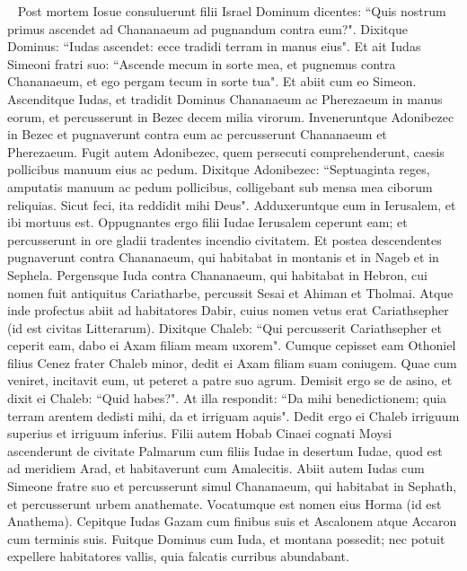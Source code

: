 
\begin{biblechapter}   
\verse Post mortem Iosue consuluerunt filii Israel Dominum dicentes: “Quis nostrum primus ascendet ad Chananaeum ad pugnandum contra eum?". 
\verse Dixitque Dominus: “Iudas ascendet: ecce tradidi terram in manus eius". 
\verse Et ait Iudas Simeoni fratri suo: “Ascende mecum in sorte mea, et pugnemus contra Chananaeum, et ego pergam tecum in sorte tua". Et abiit cum eo Simeon. 
\verse Ascenditque Iudas, et tradidit Dominus Chananaeum ac Pherezaeum in manus eorum, et percusserunt in Bezec decem milia virorum. 
\verse Inveneruntque Adonibezec in Bezec et pugnaverunt contra eum ac percusserunt Chananaeum et Pherezaeum. 
\verse Fugit autem Adonibezec, quem persecuti comprehenderunt, caesis pollicibus manuum eius ac pedum. 
\verse Dixitque Adonibezec: “Septuaginta reges, amputatis manuum ac pedum pollicibus, colligebant sub mensa mea ciborum reliquias. Sicut feci, ita reddidit mihi Deus". Adduxeruntque eum in Ierusalem, et ibi mortuus est. 
\verse Oppugnantes ergo filii Iudae Ierusalem ceperunt eam; et percusserunt in ore gladii tradentes incendio civitatem. 
\verse Et postea descendentes pugnaverunt contra Chananaeum, qui habitabat in montanis et in Nageb et in Sephela. 
\verse Pergensque Iuda contra Chananaeum, qui habitabat in Hebron, cui nomen fuit antiquitus Cariatharbe, percussit Sesai et Ahiman et Tholmai. 
\verse Atque inde profectus abiit ad habitatores Dabir, cuius nomen vetus erat Cariathsepher (id est civitas Litterarum). 
\verse Dixitque Chaleb: “Qui percusserit Cariathsepher et ceperit eam, dabo ei Axam filiam meam uxorem". 
\verse Cumque cepisset eam Othoniel filius Cenez frater Chaleb minor, dedit ei Axam filiam suam coniugem. 
\verse Quae cum veniret, incitavit eum, ut peteret a patre suo agrum. Demisit ergo se de asino, et dixit ei Chaleb: “Quid habes?". 
\verse At illa respondit: “Da mihi benedictionem; quia terram arentem dedisti mihi, da et irriguam aquis". Dedit ergo ei Chaleb irriguum superius et irriguum inferius. 
\verse Filii autem Hobab Cinaei cognati Moysi ascenderunt de civitate Palmarum cum filiis Iudae in desertum Iudae, quod est ad meridiem Arad, et habitaverunt cum Amalecitis. 
\verse Abiit autem Iudas cum Simeone fratre suo et percusserunt simul Chananaeum, qui habitabat in Sephath, et percusserunt urbem anathemate. Vocatumque est nomen eius Horma (id est Anathema). 
\verse Cepitque Iudas Gazam cum finibus suis et Ascalonem atque Accaron cum terminis suis. 
\verse Fuitque Dominus cum Iuda, et montana possedit; nec potuit expellere habitatores vallis, quia falcatis curribus abundabant. 

\end{biblechapter}
